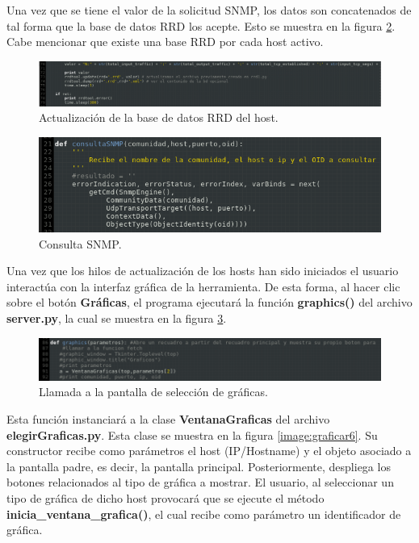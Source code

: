 Una vez que se tiene el valor de la solicitud SNMP, los datos son concatenados de tal forma que la base de datos RRD los acepte. Esto se muestra en la figura \ref{image:graficar4}. Cabe mencionar que existe una base RRD por cada host activo.

\FloatBarrier
\begin{figure}[htbp!]
		\centering
			\includegraphics[width=.9 \textwidth]{images/graficar4}
		\caption{Actualización de la base de datos RRD del host.}
		\label{image:graficar3}
\end{figure}
\FloatBarrier

\FloatBarrier
\begin{figure}[htbp!]
		\centering
			\includegraphics[width=.9 \textwidth]{images/graficar5}
		\caption{Consulta SNMP.}
		\label{image:graficar4}
\end{figure}
\FloatBarrier

Una vez que los hilos de actualización de los hosts han sido iniciados el usuario interactúa con la interfaz gráfica de la herramienta. De esta forma, al hacer clic sobre el botón \textbf{Gráficas}, el programa ejecutará la función \textbf{graphics()} del archivo \textbf{server.py}, la cual se muestra en la figura \ref{image:graficar5}.

\FloatBarrier
\begin{figure}[htbp!]
		\centering
			\includegraphics[width=.9 \textwidth]{images/graficar2}
		\caption{Llamada a la pantalla de selección de gráficas.}
		\label{image:graficar5}
\end{figure}
\FloatBarrier

Esta función instanciará a la clase \textbf{VentanaGraficas} del archivo \textbf{elegirGraficas.py}. Esta clase se muestra en la figura \ref{image:graficar6}. Su constructor recibe como parámetros el host (IP/Hostname) y el objeto asociado a la pantalla padre, es decir, la pantalla principal. Posteriormente, despliega los botones relacionados al tipo de gráfica a mostrar. El usuario, al seleccionar un tipo de gráfica de dicho host provocará que se ejecute el método \textbf{inicia\_ventana\_grafica()}, el cual recibe como parámetro un identificador de gráfica.


